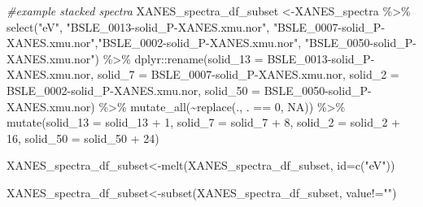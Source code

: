 \documentclass[
]{article}
\newenvironment{Shaded}{\begin{snugshade}}{\end{snugshade}}
\newcommand{\AttributeTok}[1]{\textcolor[rgb]{0.77,0.63,0.00}{#1}}
\newcommand{\CommentTok}[1]{\textcolor[rgb]{0.56,0.35,0.01}{\textit{#1}}}
\newcommand{\ConstantTok}[1]{\textcolor[rgb]{0.00,0.00,0.00}{#1}}
\newcommand{\DecValTok}[1]{\textcolor[rgb]{0.00,0.00,0.81}{#1}}
\newcommand{\FunctionTok}[1]{\textcolor[rgb]{0.00,0.00,0.00}{#1}}
\newcommand{\NormalTok}[1]{#1}
\newcommand{\OtherTok}[1]{\textcolor[rgb]{0.56,0.35,0.01}{#1}}
\newcommand{\SpecialCharTok}[1]{\textcolor[rgb]{0.00,0.00,0.00}{#1}}
\newcommand{\StringTok}[1]{\textcolor[rgb]{0.31,0.60,0.02}{#1}}
\begin{document}
\begin{Shaded}
\begin{Highlighting}[]
\CommentTok{\#example stacked spectra}
\NormalTok{XANES\_spectra\_df\_subset }\OtherTok{\textless{}{-}}\NormalTok{XANES\_spectra }\SpecialCharTok{\%\textgreater{}\%}
  \FunctionTok{select}\NormalTok{(}\StringTok{"eV"}\NormalTok{, }\StringTok{"BSLE\_0013{-}solid\_P{-}XANES.xmu.nor"}\NormalTok{, }\StringTok{"BSLE\_0007{-}solid\_P{-}XANES.xmu.nor"}\NormalTok{,}\StringTok{"BSLE\_0002{-}solid\_P{-}XANES.xmu.nor"}\NormalTok{, }\StringTok{"BSLE\_0050{-}solid\_P{-}XANES.xmu.nor"}\NormalTok{) }\SpecialCharTok{\%\textgreater{}\%}
\NormalTok{  dplyr}\SpecialCharTok{::}\FunctionTok{rename}\NormalTok{(}\StringTok{\textquotesingle{}solid\_13\textquotesingle{}} \OtherTok{=} \StringTok{\textquotesingle{}BSLE\_0013{-}solid\_P{-}XANES.xmu.nor\textquotesingle{}}\NormalTok{,}
                \StringTok{\textquotesingle{}solid\_7\textquotesingle{}} \OtherTok{=} \StringTok{\textquotesingle{}BSLE\_0007{-}solid\_P{-}XANES.xmu.nor\textquotesingle{}}\NormalTok{,}
                \StringTok{\textquotesingle{}solid\_2\textquotesingle{}} \OtherTok{=} \StringTok{\textquotesingle{}BSLE\_0002{-}solid\_P{-}XANES.xmu.nor\textquotesingle{}}\NormalTok{,}
                \StringTok{\textquotesingle{}solid\_50\textquotesingle{}} \OtherTok{=} \StringTok{\textquotesingle{}BSLE\_0050{-}solid\_P{-}XANES.xmu.nor\textquotesingle{}}\NormalTok{) }\SpecialCharTok{\%\textgreater{}\%}
  \FunctionTok{mutate\_all}\NormalTok{(}\SpecialCharTok{\textasciitilde{}}\FunctionTok{replace}\NormalTok{(., . }\SpecialCharTok{==} \DecValTok{0}\NormalTok{, }\ConstantTok{NA}\NormalTok{)) }\SpecialCharTok{\%\textgreater{}\%}
  \FunctionTok{mutate}\NormalTok{(}\AttributeTok{solid\_13 =}\NormalTok{ solid\_13 }\SpecialCharTok{+} \DecValTok{1}\NormalTok{,}
         \AttributeTok{solid\_7 =}\NormalTok{ solid\_7 }\SpecialCharTok{+} \DecValTok{8}\NormalTok{,}
         \AttributeTok{solid\_2 =}\NormalTok{ solid\_2 }\SpecialCharTok{+} \DecValTok{16}\NormalTok{,}
         \AttributeTok{solid\_50 =}\NormalTok{ solid\_50 }\SpecialCharTok{+} \DecValTok{24}\NormalTok{) }
         
\NormalTok{XANES\_spectra\_df\_subset}\OtherTok{\textless{}{-}}\FunctionTok{melt}\NormalTok{(XANES\_spectra\_df\_subset, }\AttributeTok{id=}\FunctionTok{c}\NormalTok{(}\StringTok{"eV"}\NormalTok{))}

\NormalTok{XANES\_spectra\_df\_subset}\OtherTok{\textless{}{-}}\FunctionTok{subset}\NormalTok{(XANES\_spectra\_df\_subset, value}\SpecialCharTok{!=}\StringTok{""}\NormalTok{)}


\end{Highlighting}
\end{Shaded}
\end{document}
